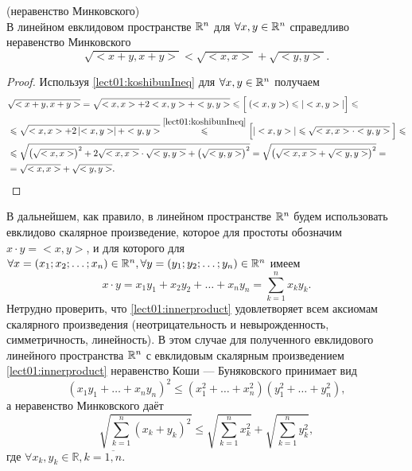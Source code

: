 \begin{consequence} (неравенство Минковского) \\
В линейном евклидовом пространстве $\mathbb{R}^n$ для $\forall x, y \in \mathbb{R}^n$ справедливо неравенство Минковского
	\begin{equation}
	\label{lect01:minkovskyIneq}
	\boxed{
		\sqrt{<x+y, x+y>} < \sqrt{<x, x>} + \sqrt{<y,y>}.
		}
	\end{equation}
\begin{proof}
	Используя \eqref{lect01:koshibunIneq} для $\forall x, y \in \mathbb{R}^n$ получаем 
	\begin{equation*}
	\begin{split}
	& \sqrt{<x+y, x+y>} = \sqrt{<x,x> + 2 <x,y> + <y,y>} \leqslant \left[ \dfrac{ }{ }(<x,y>) \leqslant |<x,y>| \right] \leqslant \\
	& \leqslant \sqrt{<x,x> + 2 \left\lvert <x,y> \right\rvert + <y,y>} \stackrel{\eqref{lect01:koshibunIneq}}\leqslant \left[
	|<x,y>| \leqslant \sqrt{<x,x> \cdot <y,y>} \dfrac{ }{ }\right] \leqslant \\
	& \leqslant \sqrt{\left(\sqrt{<x,x>}\right)^2 + 2 \sqrt{ <x,x> } \cdot \sqrt{ <y,y> } + \left(\sqrt{<y,y>}\right)^2} = \sqrt{\left(\sqrt{<x,x>} + \sqrt{<y,y>}\right)^2} = \\
	& = \sqrt{<x,x>} + \sqrt{<y,y>}.
	\end{split}	
	\end{equation*}
\end{proof}
\end{consequence}
\begin{note}
	В дальнейшем, как правило, в линейном пространстве $\mathbb{R}^n$ будем использовать евклидово скалярное произведение, которое для простоты обозначим $x \cdot y = <x,y>$, и для которого для $\forall x = \left(x_1; x_2; \ldots; x_n\right) \in \mathbb{R}^n, \forall y = \left(y_1; y_2; \ldots; y_n\right) \in \mathbb{R}^n$ имеем
	\begin{equation}
	\label{lect01:innerproduct}
	\boxed{
		x \cdot y = x_1 y_1 + x_2 y_2 + \ldots + x_n y_n = \sum_{k=1}^{n}x_k y_k.}
	\end{equation}
	Нетрудно проверить, что \eqref{lect01:innerproduct} удовлетворяет всем аксиомам скалярного произведения (неотрицательность и невырожденность, симметричность, линейность). В этом случае для полученного евклидового линейного пространства $\mathbb{R}^n$ с евклидовым скалярным произведением \eqref{lect01:innerproduct} неравенство Коши — Буняковского принимает вид
	\begin{equation}
	\label{lect01:koshibunIneq2}
	\boxed{
		\left(x_1 y_1 + \ldots + x_n y_n\right)^2 \leqslant \left(x_1^2 + \ldots + x_n^2\right)\left(y_1^2 + \ldots + y_n^2\right),}
	\end{equation}
	а неравенство Минковского даёт
	\begin{equation}
	\label{lect01:minkovskyIneq2}
	\boxed{
		\sqrt{\sum_{k=1}^{n} \left(x_k + y_k\right)^2} \leqslant \sqrt{\sum_{k=1}^{n} x_k^2} + \sqrt{\sum_{k=1}^{n} y_k^2},}
	\end{equation}
	где $\forall x_k, y_k \in \mathbb{R}, k = \overline{1, n}$.
\end{note}

